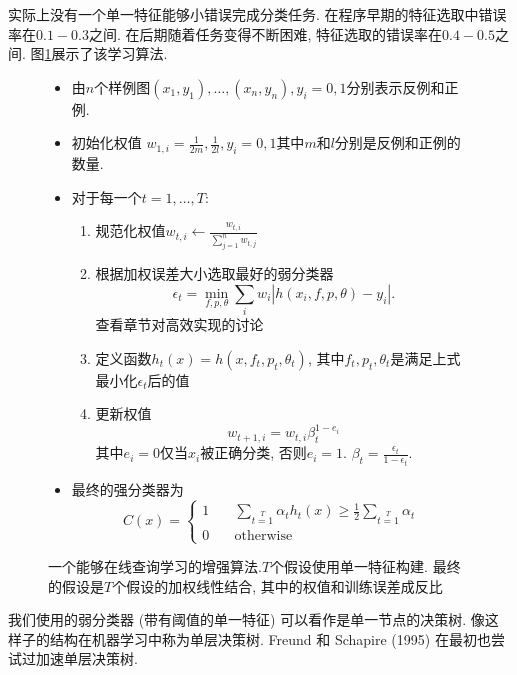 \documentclass[a4paper,utf8,11pt, onecolumn]{ctexart}
\begin{document}
实际上没有一个单一特征能够小错误完成分类任务. 在程序早期的特征选取中错误率在$0.1-0.3$之间. 在后期随着任务变得不断困难, 特征选取的错误率在$0.4-0.5$之间. 图\ref{fig:adaboost}展示了该学习算法.
\begin{figure}[htb]
\kaishu{}
    \caption{一个能够在线查询学习的增强算法.$T$个假设使用单一特征构建. 最终的假设是$T$个假设的加权线性结合, 其中的权值和训练误差成反比}
    \label{fig:adaboost}
    \begin{itemize}
        \item 由$n$个样例图$(x_1,y_1),\ldots,(x_n,y_n), y_i=0, 1$分别表示反例和正例.
        \item 初始化权值 $w_{1,i}=\frac{1}{2m}, \frac{1}{2l},y_i=0,1$其中$m$和$l$分别是反例和正例的数量.
        \item 对于每一个$t=1,\ldots,T$:
            \begin{enumerate}
                \item 规范化权值$w_{t,i}\leftarrow \frac{w_{t,i}}{\sum_{j=1}^n w_{t,j}}$
                \item 根据加权误差大小选取最好的弱分类器
                    \[
                        \epsilon_t=\min_{f,p,\theta}\sum_i{w_i| h(x_i,f,p,\theta)-y_i |}.
                    \]
                    查看章节对高效实现的讨论
                \item 定义函数$h_t(x)=h(x,f_t,p_t,\theta_t)$, 其中$f_t,p_t,\theta_t$是满足上式最小化$\epsilon_t$后的值
                \item 更新权值
                    \[
                        w_{t+1,i}=w_{t,i}\beta_t^{1-e_i}
                    \]
                    其中$e_i=0$仅当$x_i$被正确分类, 否则$e_i=1$. $\beta_t=\frac{\epsilon_t}{1-\epsilon_t}$.
            \end{enumerate}
        \item 最终的强分类器为
            \[
                C(x)=
                \begin{cases}
                    1 &\quad\sum\limits_{t=1}\limits^T \alpha_t h_t(x)\geq \frac12\sum\limits_{t=1}\limits^T\alpha_t\\
                    0 &\quad\text{otherwise}
                \end{cases}
            \]
    \end{itemize}
\end{figure}

我们使用的弱分类器 (带有阈值的单一特征) 可以看作是单一节点的决策树. 像这样子的结构在机器学习中称为单层决策树. Freund 和 Schapire (1995) 在最初也尝试过加速单层决策树.
\end{document}
